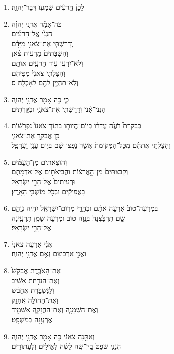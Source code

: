 \documentclass[12pt,a4paper,titlepage]{article}
\def \pslabelsep{-0.9em} %
\def \psleftmargin{0em} %
\begin{document}
\begin{enumerate}[leftmargin=\psleftmargin, labelsep = \pslabelsep, label={\arabic*}, font=\color{\pscolor}\small\textsuperscript, parsep=0em, itemsep=0em, topsep=0em ]
\item \texthebrew{לָכֵן֙ הָֽרֹעִ֔ים שִׁמְע֖וּ דְּבַר־יְהוָֽה׃}
\item \texthebrew{כֹּה־אָמַ֞ר אֲדֹנָ֣י יְהוִ֗ה \\ הִנְנִ֙י אֶֽל־הָרֹעִ֜ים \\ וְֽדָרַשְׁתִּ֧י אֶת־צֹאנִ֣י מִיָּדָ֗ם \\ וְהִשְׁבַּתִּים֙ מֵרְע֣וֹת צֹ֔אן \\ וְלֹא־יִרְע֥וּ ע֛וֹד הָרֹעִ֖ים אוֹתָ֑ם \\ וְהִצַּלְתִּ֤י צֹאנִי֙ מִפִּיהֶ֔ם \\ וְלֹֽא־תִהְיֶ֥יןָ לָהֶ֖ם לְאָכְלָֽה׃ ס}\parSpace
\item \texthebrew{כִּ֛י כֹּ֥ה אָמַ֖ר אֲדֹנָ֣י יְהוִ֑ה \\ הִנְנִי־אָ֕נִי וְדָרַשְׁתִּ֥י אֶת־צֹאנִ֖י וּבִקַּרְתִּֽים׃}
\item \texthebrew{כְּבַקָּרַת֩ רֹעֶ֙ה עֶדְר֜וֹ בְּיוֹם־הֱיוֹת֤וֹ בְתוֹךְ־צֹאנוֹ֙ נִפְרָשׁ֔וֹת \\ כֵּ֖ן אֲבַקֵּ֣ר אֶת־צֹאנִ֑י \\ וְהִצַּלְתִּ֣י אֶתְהֶ֗ם מִכָּל־הַמְּקוֹמֹת֙ אֲשֶׁ֣ר נָפֹ֣צוּ שָׁ֔ם בְּי֥וֹם עָנָ֖ן וַעֲרָפֶֽל׃}
\item \texthebrew{וְהוֹצֵאתִ֣ים מִן־הָעַמִּ֗ים \\ וְקִבַּצְתִּים֙ מִן־הָ֣אֲרָצ֔וֹת וַהֲבִיאֹתִ֖ים אֶל־אַדְמָתָ֑ם \\ וּרְעִיתִים֙ אֶל־הָרֵ֣י יִשְׂרָאֵ֔ל \\ בָּאֲפִיקִ֕ים וּבְכֹ֖ל מוֹשְׁבֵ֥י הָאָֽרֶץ׃}
\item \texthebrew{בְּמִרְעֶה־טּוֹב֙ אֶרְעֶ֣ה אֹתָ֔ם וּבְהָרֵ֥י מְרֽוֹם־יִשְׂרָאֵ֖ל יִהְיֶ֣ה נְוֵהֶ֑ם \\ שָׁ֤ם תִּרְבַּ֙צְנָה֙ בְּנָ֣וֶה טּ֔וֹב וּמִרְעֶ֥ה שָׁמֵ֛ן תִּרְעֶ֖ינָה \\ אֶל־הָרֵ֥י יִשְׂרָאֵֽל׃}
\item \texthebrew{אֲנִ֙י אֶרְעֶ֤ה צֹאנִי֙ \\ וַאֲנִ֣י אַרְבִּיצֵ֔ם נְאֻ֖ם אֲדֹנָ֥י יְהוִֽה׃}
\item \texthebrew{אֶת־הָאֹבֶ֤דֶת אֲבַקֵּשׁ֙ \\ וְאֶת־הַנִּדַּ֣חַת אָשִׁ֔יב \\ וְלַנִּשְׁבֶּ֣רֶת אֶחֱבֹ֔שׁ \\ וְאֶת־הַחוֹלָ֖ה אֲחַזֵּ֑ק \\ וְאֶת־הַשְּׁמֵנָ֧ה וְאֶת־הַחֲזָקָ֛ה אַשְׁמִ֖יד \\ אֶרְעֶ֥נָּה בְמִשְׁפָּֽט׃}
\item \texthebrew{וְאַתֵּ֣נָה צֹאנִ֔י כֹּ֥ה אָמַ֖ר אֲדֹנָ֣י יְהוִ֑ה \\ הִנְנִ֤י שֹׁפֵט֙ בֵּֽין־שֶׂ֣ה לָשֶׂ֔ה לָאֵילִ֖ים וְלָעַתּוּדִֽים׃}

\end{enumerate}
\end{document}
